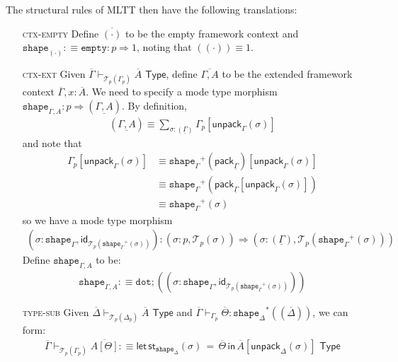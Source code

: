 \documentclass[10pt]{article}
\theoremstyle{definition}
\newcommand{\yields}{\vdash}
\newcommand{\tcell}{\Rightarrow}
\newcommand{\TYPE}{\,\,\mathsf{Type}}
\newcommand{\sigmacl}[3]{\ensuremath{(#1{:}#2,#3)}}
\newcommand{\id}{\mathsf{id}}
\newcommand\St[2]{\ensuremath{{#1}^*(#2)}}
\newcommand\StI[2]{\ensuremath{\mathsf{st}_{#1}(#2)}}
\newcommand\StE[4]{\ensuremath{\mathsf{let} \, \StI{#1}{#3} \, = \, {#2} \, \mathsf{in} \, #4}}
\newcommand\TrPlus[2]{\ensuremath{{#1}^+(#2)}}
\newcommand\El[2]{\mathcal{T}_{#1}(#2)}
\newcommand\ctxtuple[1]{(#1)}
\newcommand\pack[1]{\ensuremath{\mathsf{pack}_{#1}}}
\newcommand\unpack[2]{\ensuremath{\mathsf{unpack}_{#1}(#2)}}
\newcommand{\modeof}[1]{{#1}_p}
\newcommand{\tdot}{\ensuremath{\mathtt{dot}}}
\newcommand{\tempty}{\ensuremath{\mathtt{empty}}}
\newcommand{\tshape}[1]{\ensuremath{\mathtt{shape}_{#1}}}
\newcommand{\upstairs}[1]{\overline{#1}}
\newcommand{\downstairs}[1]{\underline{#1}}
\begin{document}
The structural rules of MLTT then have the following translations:
\begin{enumerate}
\item[\textsc{ctx-empty}] Define $\upstairs{(\cdot)}$ to be the empty framework context and $\tshape{(\cdot)} :\equiv \tempty : p \tcell 1$, noting that $\ctxtuple{(\cdot)} \equiv 1$.

\item[\textsc{ctx-ext}] Given $\upstairs{\Gamma}
  \yields_{\El{p}{\modeof{\Gamma}}} \upstairs{A} \TYPE$, define $\upstairs{\Gamma, A}$ to be the extended framework context $\upstairs{\Gamma}, x : \upstairs{A}$. We need to specify a mode type morphism $\tshape{\Gamma, A} : p \tcell \ctxtuple{\downstairs{\Gamma, A}}$. 
  By definition,
  \begin{align*}
    \ctxtuple{\downstairs{\Gamma, A}} \equiv \sum_{\sigma : \ctxtuple{\downstairs{\Gamma}}} \modeof{\Gamma}[\unpack{\Gamma}{\sigma}]
  \end{align*}
  and note that 
  \begin{align*}
  \modeof{\Gamma}[\unpack{\Gamma}{\sigma}]
  &\equiv \TrPlus{\tshape{\Gamma}}{\pack{\downstairs{\Gamma}}}[\unpack{\Gamma}{\sigma}] \\
  &\equiv \TrPlus{\tshape{\Gamma}}{\pack{\downstairs{\Gamma}}[\unpack{\Gamma}{\sigma}]} \\
  &\equiv \TrPlus{\tshape{\Gamma}}{\sigma}
  \end{align*}
  so we have a mode type morphism
  \begin{align*}
  \sigmacl{\sigma}{\tshape{\Gamma}}{\id_{\El{p}{\TrPlus{\tshape{\Gamma}}{\sigma}}}} : \sigmacl{\sigma}{p}{\El{p}{\sigma}} \tcell \sigmacl{\sigma}{\ctxtuple{\downstairs{\Gamma}}}{\El{p}{\TrPlus{\tshape{\Gamma}}{\sigma}}}
  \end{align*}
  Define $\tshape{\Gamma, A}$ to be:
  \begin{align*}
  \tshape{\Gamma, A} :\equiv \tdot ; (\sigmacl{\sigma}{\tshape{\Gamma}}{\id_{\El{p}{\TrPlus{\tshape{\Gamma}}{\sigma}}}})
  \end{align*}
  
\item[\textsc{type-sub}] Given $\upstairs{\Delta} \yields_{\El{p}{\modeof{\Delta}}} \upstairs{A} \TYPE$ and $\upstairs{\Gamma} \yields_{\modeof{\Gamma}} \upstairs{\Theta} : \St{\tshape{\Delta}}{\ctxtuple{\upstairs{\Delta}}}$, we can form:
\begin{align*}
\upstairs{\Gamma} \yields_{\El{p}{\modeof{\Gamma}}} \upstairs{A[\Theta]} :\equiv \StE{\tshape{\Delta}}{\upstairs{\Theta}}{\sigma}{\upstairs{A}[\unpack{\Delta}{\sigma}]} \TYPE
\end{align*}


\end{enumerate}
\end{document}
